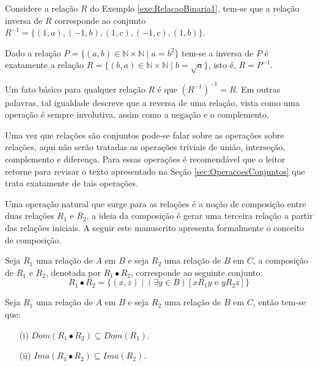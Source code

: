 \begin{example}
	Considere a relação $R$ do Exemplo \ref{exe:RelacaoBinaria1}, tem-se que a relação inversa de $R$ corresponde ao conjunto $R^{-1} = \{(1, a), (-1, b), (1, c), (-1, c), (1, b)\}$.
\end{example}

\begin{example}
	Dado a relação $P = \{(a, b) \in \mathbb{N} \times \mathbb{N} \mid a = b^2\}$ tem-se a inversa de $P$ é exatamente a relação $R = \{(b, a) \in \mathbb{N} \times \mathbb{N} \mid b = \sqrt{a}\}$, isto é, $R = P^{-1}$.
\end{example}

\begin{remark}\label{rema:InvolucaoRelacaoInversa}
	Um fato básico para qualquer relação $R$ é que $(R^{-1})^{-1} = R$. Em outras palavras, tal igualdade descreve que a reversa de uma relação, vista como uma operação é sempre involutiva, assim como a negação e o complemento.
\end{remark}

Uma vez que relações são conjuntos pode-se falar sobre as operações sobre relações, aqui não serão tratadas as operações triviais de união, interseção, complemento e diferença. Para essas operações é recomendável que o leitor retorne para revisar o texto apresentado na Seção \ref{sec:OperacoesConjuntos} que trata exatamente de tais operações. 

Uma operação natural que surge para as relações é a noção de composição entre duas relações $R_1$ e $R_2$, a ideia da composição é gerar uma terceira relação a partir das relações iniciais. A seguir este manuscrito apresenta formalmente o conceito de composição.

\begin{definition}\label{def:ComposicaoRelacoes}
	Seja $R_1$ uma relação de $A$ em $B$ e seja $R_2$ uma relação de $B$ em $C$, a composição de $R_1$ e $R_2$, denotada por $R_1 \bullet R_2$, corresponde ao seguinte conjunto:
	$$R_1 \bullet R_2 = \{(x, z) \mid (\exists y \in B)[x\mathrel{R_1}y \text{ e } y\mathrel{R_2}z] \}$$ 
\end{definition}

\begin{proposition}
	Seja $R_1$ uma relação de $A$ em $B$ e seja $R_2$ uma relação de $B$ em $C$, então tem-se que:
	\begin{itemize}
		\item[(i)] $Dom(R_1 \bullet R_2) \subseteq Dom(R_1)$.
		\item[(ii)] $Ima(R_1 \bullet R_2) \subseteq Ima(R_2)$.
	\end{itemize}
\end{proposition}

